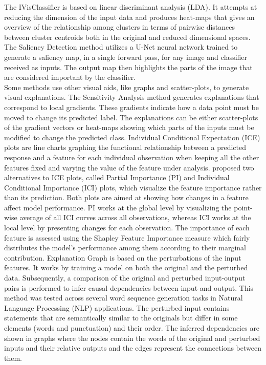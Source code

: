 \documentclass[final,1p,times]{elsarticle}
\begin{document}
The IVisClassifier \cite{choo2010ivisclassifier} is based on linear discriminant analysis (LDA). It attempts at reducing the dimension of the input data and produces heat-maps that gives an overview of the relationship among clusters in terms of pairwise distances between cluster centroids both in the original and reduced dimensional spaces.
The Saliency Detection method \cite{dabkowski2017real} utilizes a U-Net neural network trained to generate a saliency map, in a single forward pass, for any image and classifier received as inputs. The output map then highlights the parts of the image that are considered important by the classifier.\\

Some methods use other visual aids, like graphs and scatter-plots, to generate visual explanations.
The Sensitivity Analysis method \cite{baehrens2010explain} generates explanations that correspond to local gradients. These gradients indicate how a data point must be moved to change its predicted label. The explanations can be either scatter-plots of the gradient vectors or heat-maps showing which parts of the inputs must be modified to change the predicted class.
Individual Conditional Expectation (ICE) plots \cite{goldstein2015peeking} are line charts graphing the functional relationship between a predicted response and a feature for each individual observation when keeping all the other features fixed and varying the value of the feature under analysis. \cite{casalicchio2018visualizing} proposed two alternatives to ICE plots, called Partial Importance (PI) and Individual Conditional Importance (ICI) plots, which visualize the feature importance rather than its prediction. Both plots are aimed at showing how changes in a feature affect model performance. PI works at the global level by visualizing the point-wise average of all ICI curves across all observations, whereas ICI works at the local level by presenting changes for each observation. The importance of each feature is assessed using the Shapley Feature Importance measure which fairly distributes the model's performance among them according to their marginal contribution.
Explanation Graph \cite{alvarez2017causal} is based on the perturbations of the input features. It works by training a model on both the original and the perturbed data. Subsequently, a comparison of the original and perturbed input-output pairs is performed to infer causal dependencies between input and output. This method was tested across several word sequence generation tasks in Natural Language Processing (NLP) applications. The perturbed input contains statements that are semantically similar to the originals but differ in some elements (words and punctuation) and their order. The inferred dependencies are shown in graphs where the nodes contain the words of the original and perturbed inputs and their relative outputs and the edges represent the connections between them.
\end{document}
